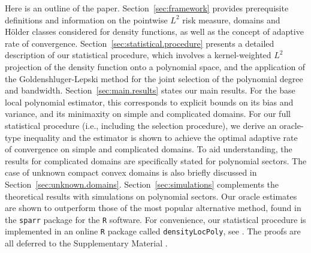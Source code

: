 \documentclass[bj,authoryear]{imsart}
\numberwithin{equation}{section}
\theoremstyle{plain}
\theoremstyle{remark}
\newtheorem{remark}{Remark}
\newcommand{\1}{\mathds{1}}
\begin{document}

    Here is an outline of the paper. Section~\ref{sec:framework} provides prerequisite definitions and information on the pointwise $L^2$ risk measure, domains and H\"older classes considered for density functions, as well as the concept of adaptive rate of convergence. Section~\ref{sec:statistical.procedure} presents a detailed description of our statistical procedure, which involves a kernel-weighted $L^2$ projection of the density function onto a polynomial space, and the application of the Goldenshluger-Lepski method for the joint selection of the polynomial degree and bandwidth. Section~\ref{sec:main.results} states our main results. For the base local polynomial estimator, this corresponds to explicit bounds on its bias and variance, and its minimaxity on simple and complicated domains. For our full statistical procedure (i.e., including the selection procedure), we derive an oracle-type inequality and the estimator is shown to achieve the optimal adaptive rate of convergence on simple and complicated domains. To aid understanding, the results for complicated domains are specifically stated for polynomial sectors. The case of unknown compact convex domains is also briefly discussed in Section~\ref{sec:unknown.domains}. Section~\ref{sec:simulations} complements the theoretical results with simulations on polynomial sectors. Our oracle estimates are shown to outperform those of the most popular alternative method, found in the \texttt{sparr} package \cite{Davies_et_al2024} for the \texttt{R} software. For convenience, our statistical procedure is implemented in an online \texttt{R} package called \texttt{densityLocPoly}, see \cite{BertinKlutchnikoffOuimet2023Rcode}. The proofs are all deferred to the Supplementary Material \citep{BertinKlutchnikoffOuimet2024supplement}. %
\end{document}
